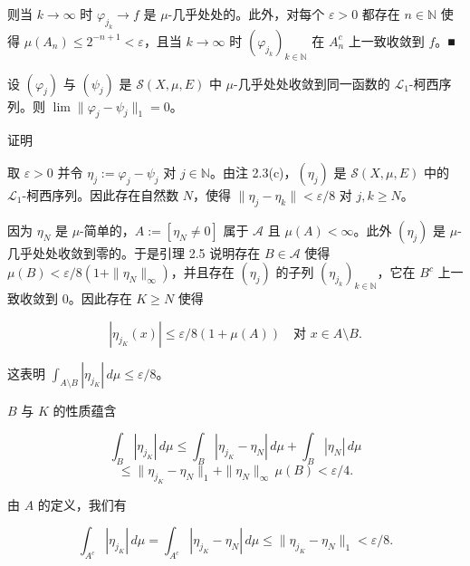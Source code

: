 \begin{lemma}
\begin{subitems}
则当 $ k \to \infty $ 时 $ \varphi_{j_k} \to f $ 是 $ \mu $-几乎处处的。此外，对每个 $ \varepsilon > 0 $ 都存在 $ n \in \mathbb{N} $ 使得 $ \mu(A_n) \le 2^{-n+1} < \varepsilon $，且当 $ k \to \infty $ 时 $ (\varphi_{j_k})_{k \in \mathbb{N}} $ 在 $ A_n^{c} $ 上一致收敛到 $ f $。\nobreak\hspace{0.35em}■

\end{subitems}

\end{lemma}

\begin{lemma}

设 $ (\varphi_j) $ 与 $ (\psi_j) $ 是 $ \mathcal{S}(X,\mu,E) $ 中 $ \mu $-几乎处处收敛到同一函数的 $ \mathcal{L}_1 $-柯西序列。则 $ \lim \|\varphi_j - \psi_j\|_1 = 0 $。

证明

\begin{subitems}
\item

取 $ \varepsilon > 0 $ 并令 $ \eta_j := \varphi_j - \psi_j $ 对 $ j \in \mathbb{N} $。由注 2.3(c)，$ (\eta_j) $ 是 $ \mathcal{S}(X,\mu,E) $ 中的 $ \mathcal{L}_1 $-柯西序列。因此存在自然数 $ N $，使得 $ \|\eta_j - \eta_k\| < \varepsilon/8 $ 对 $ j, k \ge N $。

\item

因为 $ \eta_N $ 是 $ \mu $-简单的，$ A := [\eta_N \ne 0] $ 属于 $ \mathcal{A} $ 且 $ \mu(A) < \infty $。此外 $ (\eta_j) $ 是 $ \mu $-几乎处处收敛到零的。于是引理 2.5 说明存在 $ B \in \mathcal{A} $ 使得 $ \mu(B) < \varepsilon/8(1 + \|\eta_N\|_\infty) $，并且存在 $ (\eta_j) $ 的子列 $ (\eta_{j_k})_{k \in \mathbb{N}} $，它在 $ B^{c} $ 上一致收敛到 0。因此存在 $ K \ge N $ 使得

\[
|\eta_{j_K}(x)| \le \varepsilon/8(1 + \mu(A)) \quad \text{对 } x \in A \setminus B .
\]

这表明 $ \int_{A \setminus B} |\eta_{j_K}| \, d\mu \le \varepsilon/8 $。

\item

$ B $ 与 $ K $ 的性质蕴含

\[
\int_B |\eta_{j_K}| \, d\mu \le \int_B |\eta_{j_K} - \eta_N| \, d\mu + \int_B |\eta_N| \, d\mu
\]
\[
\le \|\eta_{j_K} - \eta_N\|_1 + \|\eta_N\|_\infty \, \mu(B) < \varepsilon/4 .
\]

由 $ A $ 的定义，我们有

\[
\int_{A^{c}} |\eta_{j_K}| \, d\mu = \int_{A^{c}} |\eta_{j_K} - \eta_N| \, d\mu \le \|\eta_{j_K} - \eta_N\|_1 < \varepsilon/8 .
\]


\end{subitems}
\end{lemma}
